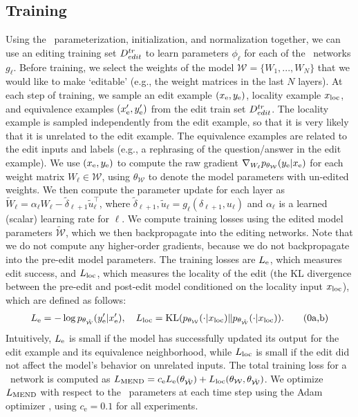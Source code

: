 \documentclass{article}
\begin{document}
\subsection{Training \name}



Using the \name~parameterization, initialization, and normalization together, we can use an editing training set $D^{tr}_{edit}$ to learn parameters $\phi_\ell$ for each of the \name~networks $g_\ell$. Before training, we select the weights of the model $\mathcal{W}=\{W_1,...,W_N\}$ that we would like to make `editable' (e.g., the weight matrices in the last $N$ layers). At each step of training, we sample an edit example $(x_\text{e},y_\text{e})$, locality example $x_\text{loc}$, and equivalence examples $(x_\text{e}',y_\text{e}')$ from the edit train set $D^{tr}_{edit}$. The locality example is sampled independently from the edit example, so that it is very likely that it is unrelated to the edit example. The equivalence examples are related to the edit inputs and labels (e.g., a rephrasing of the question/answer in the edit example). We use $(x_\text{e},y_\text{e})$ to compute the raw gradient $\nabla_{W_\ell}p_{\theta_\mathcal{W}}(y_\text{e}|x_\text{e})$ for each weight matrix $W_\ell\in\mathcal{W}$, using $\theta_\mathcal{W}$ to denote the model parameters with un-edited weights. We then compute the parameter update for each layer as $\tilde W_\ell = \alpha_\ell W_\ell - \tilde\delta_{\ell+1}\tilde u_\ell^{\top}$, where $\tilde \delta_{\ell+1}, \tilde u_\ell = g_\ell(\delta_{\ell+1},u_\ell)$ and $\alpha_\ell$ is a learned (scalar) learning rate for $\ell$. We compute training losses using the edited model parameters $\mathcal{\tilde W}$, which we then backpropagate into the editing networks. Note that we do not compute any higher-order gradients, because we do not backpropagate into the pre-edit model parameters. The training losses are $L_\text{e}$, which measures edit success, and $L_\text{loc}$, which measures the locality of the edit (the KL divergence between the pre-edit and post-edit model conditioned on the locality input $x_\text{loc}$), which are defined as follows:
\begin{subequations}
    \label{eq:losses}
    \begin{gather}
        L_\text{e} = -\log p_{\theta_\mathcal{\tilde W}}(y_\text{e}'|x_\text{e}'),\quad L_\text{loc} = \text{KL}(p_{\theta_\mathcal{W}}(\cdot|x_\text{loc}) \| p_{\theta_\mathcal{\tilde W}}(\cdot|x_\text{loc})). \tag{\theequation a,b}
    \end{gather}
\end{subequations}
Intuitively, $L_\text{e}$ is small if the model has successfully updated its output for the edit example and its equivalence neighborhood, while $L_\text{loc}$ is small if the edit did not affect the model's behavior on unrelated inputs. The total training loss for a \name~network is computed as $L_\text{MEND} = c_\text{e} L_\text{e}(\theta_\mathcal{\tilde W}) + L_\text{loc}(\theta_\mathcal{W},\theta_\mathcal{\tilde W})$. We optimize $L_\text{MEND}$ with respect to the \name~parameters at each time step using the Adam optimizer \citep{kingma2015adam}, using $c_\text{e}=0.1$ for all experiments.
\end{document}
